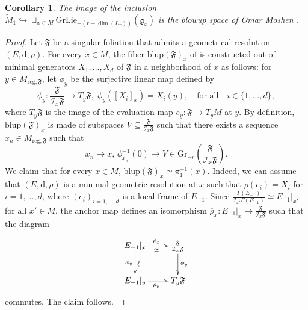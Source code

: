 \documentclass[10pt]{article}
\theoremstyle{plain}
\newtheorem{corollary}[lemma]{Corollary}
\theoremstyle{definition}
\theoremstyle{remark}
\newcommand{\dd}{\mathrm{d}}
\begin{document}
\begin{corollary}\label{cor:Moshen}
    The image of the inclusion  $\displaystyle{\widetilde{M}_1\hookrightarrow \sqcup_{x\in M} \mathrm{GrLie}_{-\left(r-\dim(L_x)\right)}(\mathfrak{g}_x)}$ is  the blowup space of Omar Moshen \cite{MohsenOmar}. 
\end{corollary}
\begin{proof}

Let $\mathfrak F$ be a singular foliation that admits a geometrical resolution $(E, \dd, \rho)$. For every $x\in M$, the fiber $\mathrm{blup}(\mathfrak F)_x$ of \cite{MohsenOmar} is constructed out of minimal generators $X_1, \ldots, X_d$ of $\mathfrak F$ in a neighborhood of $x$ as follows: for $y\in M_{\mathrm{reg}, \mathfrak F}$, let $\phi_y$ be the surjective linear map  defined by
\begin{equation}
    \phi_y\colon  \frac{\mathfrak F}{\mathcal I_x\mathfrak F} \longrightarrow T_y\mathfrak F,\; \phi_y ([X_i]_x) = X_i(y),\quad\text{for all}\quad i \in \{1,\ldots, d\},
\end{equation}
where $T_y\mathfrak F$ is the image of the evaluation map $e_y\colon \mathfrak F\longrightarrow T_yM$ at $y$. By definition, $\mathrm{blup}(\mathfrak F)_x$ is made of subspaces $V \subseteq\frac{\mathfrak F}{\mathcal I_x\mathfrak F}$ such that there
exists a sequence $x_n\in  M_{\mathrm{reg}, \mathfrak F}$ such that
\begin{equation}
    x_n \longrightarrow x,\, \phi_{x_n}^{-1}(0)\longrightarrow V\in \mathrm{Gr}_{-r}\left(\frac{\mathfrak F}{\mathcal I_x\mathfrak F}\right).
\end{equation}
We claim that for every $x\in M$, $\mathrm{blup}(\mathfrak F)_x\simeq \pi_1^{-1}(x)$. Indeed, we can assume that $(E, \dd, \rho)$ is a minimal geometric resolution at $x$ such that $\rho(e_i)=X_i$ for $i=1, \ldots,d$, where $(e_i)_{i=1, \ldots, d}$ is a local frame of $E_{-1}$. Since $\frac{\Gamma(E_{-1})}{\mathcal{I}_{x'}\Gamma(E_{-1})}\simeq {E_{-1}}|_{x'}$ for all $x'\in M$, the anchor map defines an isomorphism $\overline{\rho}_x\colon {E_{-1}|_x}\longrightarrow \frac{\mathfrak F}{\mathcal I_x\mathfrak F}$ such that the diagram 
\begin{equation}  
\xymatrix{{E_{-1}|_x}\ar[r]_{\simeq}^{\overline{\rho}_x}\ar[d]^{\rotatebox[origin=c]{90}{$\simeq$}}_{\kappa_y} &\frac{\mathfrak F}{\mathcal I_x\mathfrak F}\ar[d]^{\phi_y}\\{E_{-1}|_y}\ar[r]_{{\rho_y}} & T_y\mathfrak F}
\end{equation}
commutes. The claim follows.

\end{proof}
\end{document}
